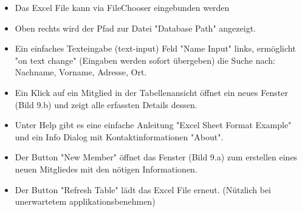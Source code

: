 \documentclass{article}
\begin{document}
\begin{itemize}

		\item Das Excel File kann via FileChooser eingebunden werden
		\item Oben rechts wird der Pfad zur Datei "Database Path" angezeigt.
		\item Ein einfaches Texteingabe (text-input) Feld "Name Input" links, ermöglicht "on text change" (Eingaben werden sofort übergeben) die Suche nach: Nachname, Vorname, Adresse, Ort.
		\item Ein Klick auf ein Mitglied in der Tabellenansicht öffnet ein neues Fenster (Bild 9.b) und zeigt alle erfassten Details dessen.
		\item Unter Help gibt es eine einfache Anleitung "Excel Sheet Format Example" und ein Info Dialog mit Kontaktinformationen "About".
		\item Der Button "New Member" öffnet das Fenster (Bild 9.a) zum erstellen eines neuen Mitgliedes mit den nötigen Informationen.
		\item Der Button "Refresh Table" lädt das Excel File erneut. (Nützlich bei unerwartetem applikationsbenehmen)
	 \end{itemize}



\newpage

\end{document}

